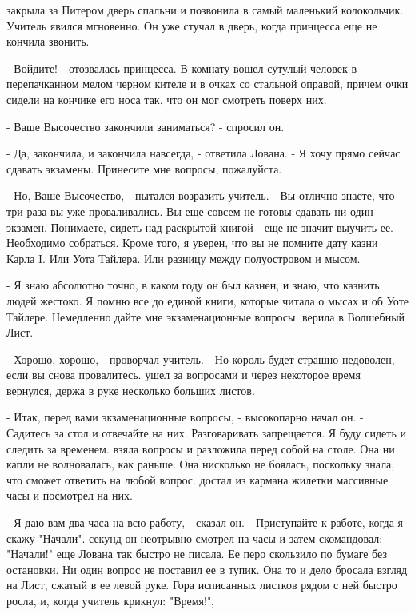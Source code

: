  закрыла за Питером дверь спальни и позвонила в самый маленький 
колокольчик. Учитель явился мгновенно. Он уже стучал в дверь, когда 
принцесса еще не кончила звонить.
\par- Войдите! - отозвалась принцесса. В комнату вошел сутулый человек 
в перепачканном мелом черном кителе и в очках со стальной оправой, 
причем очки сидели на кончике его носа так, что он мог смотреть поверх 
них.
\par- Ваше Высочество закончили заниматься? - спросил он.
\par- Да, закончила, и закончила навсегда, - ответила Лована. - Я хочу 
прямо сейчас сдавать экзамены. Принесите мне вопросы, пожалуйста.
\par- Но, Ваше Высочество, - пытался возразить учитель. - Вы отлично 
знаете, что три раза вы уже проваливались. Вы еще совсем не готовы 
сдавать ни один экзамен. Понимаете, сидеть над раскрытой книгой - еще 
не значит выучить ее. Необходимо собраться. Кроме того, я уверен, что 
вы не помните дату казни Карла I. Или Уота Тайлера. Или разницу между 
полуостровом и мысом.
\par- Я знаю абсолютно точно, в каком году он был казнен, и знаю, что 
казнить людей жестоко. Я помню все до единой книги, которые читала о 
мысах и об Уоте Тайлере. Немедленно дайте мне экзаменационные вопросы.
 верила в Волшебный Лист.
\par- Хорошо, хорошо, - проворчал учитель. - Но король будет страшно 
недоволен, если вы снова провалитесь.
 ушел за вопросами и через некоторое время вернулся, держа в 
руке несколько больших листов.
\par- Итак, перед вами экзаменационные вопросы, - высокопарно начал 
он. - Садитесь за стол и отвечайте на них. Разговаривать запрещается. 
Я буду сидеть и следить за временем.
 взяла вопросы и разложила перед собой на столе. Она ни 
капли не волновалась, как раньше. Она нисколько не боялась, поскольку 
знала, что сможет ответить на любой вопрос.
 достал из кармана жилетки массивные часы и посмотрел на 
них.
\par- Я даю вам два часа на всю работу, - сказал он. - Приступайте к 
работе, когда я скажу "Начали".
 секунд он неотрывно смотрел на часы и затем скомандовал: 
"Начали!"
 еще Лована так быстро не писала. Ее перо скользило по 
бумаге без остановки. Ни один вопрос не поставил ее в тупик. Она то и 
дело бросала взгляд на Лист, сжатый в ее левой руке. Гора исписанных 
листков рядом с ней быстро росла, и, когда учитель крикнул: "Время!", 
